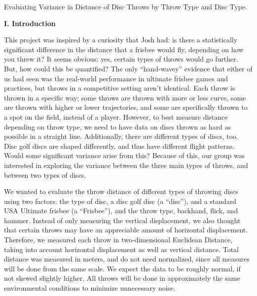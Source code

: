 \documentclass[letter,12pt]{article}
\begin{document}
	\begin{center}
		Evaluating Variance in Distance of Disc Throws by Throw Type and Disc Type.
	\end{center}
	\begin{center}
		\textbf{I. Introduction}\par
	\end{center}
	\justify
	This project was inspired by a curiosity that Josh had: is there a statistically significant difference in the distance that a frisbee would fly, depending on how you threw it? It seems obvious: yes, certain types of throws would go further. But, how could this be quantified? The only “hand-wavey” evidence that either of us had seen was the real-world performance in ultimate frisbee games and practices, but throws in a competitive setting aren’t identical. Each throw is thrown in a specific way; some throws are thrown with more or less curve, some are thrown with higher or lower trajectories, and some are specifically thrown to a spot on the field, instead of a player. However, to best measure distance depending on throw type, we need to have data on discs thrown as hard as possible in a straight line. Additionally, there are different types of discs, too. Disc golf discs are shaped differently, and thus have different flight patterns. Would some significant variance arise from this? Because of this, our group was interested in exploring the variance between the three main types of throws, and between two types of discs. \par
	We wanted to evaluate the throw distance of different types of throwing discs using two factors:  the type of disc, a disc golf disc (a “disc”), and a standard USA Ultimate frisbee (a “Frisbee”), and the throw type, backhand, flick, and hammer.  Instead of only measuring the vertical displacement, we also thought that certain throws may have an appreciable amount of horizontal displacement. Therefore, we measured each throw in two-dimensional Euclidean Distance, taking into account horizontal displacement as well as vertical distance. Total distance was measured in meters, and do not need normalized, since all measures will be done from the same scale. We expect the data to be roughly normal, if not skewed slightly higher. All throws will be done in approximately the same environmental conditions to minimize unnecessary noise. \par
\end{document}
